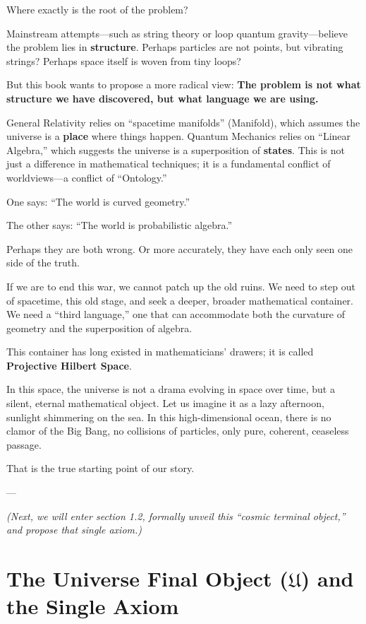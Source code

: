 \documentclass[11pt,a4paper,twoside]{book}
\begin{document}
Where exactly is the root of the problem?

Mainstream attempts---such as string theory or loop quantum gravity---believe the problem lies in \textbf{structure}. Perhaps particles are not points, but vibrating strings? Perhaps space itself is woven from tiny loops?

But this book wants to propose a more radical view: \textbf{The problem is not what structure we have discovered, but what language we are using.}

General Relativity relies on ``spacetime manifolds'' (Manifold), which assumes the universe is a \textbf{place} where things happen. Quantum Mechanics relies on ``Linear Algebra,'' which suggests the universe is a superposition of \textbf{states}. This is not just a difference in mathematical techniques; it is a fundamental conflict of worldviews---a conflict of ``Ontology.''

One says: ``The world is curved geometry.''

The other says: ``The world is probabilistic algebra.''

Perhaps they are both wrong. Or more accurately, they have each only seen one side of the truth.

If we are to end this war, we cannot patch up the old ruins. We need to step out of spacetime, this old stage, and seek a deeper, broader mathematical container. We need a ``third language,'' one that can accommodate both the curvature of geometry and the superposition of algebra.

This container has long existed in mathematicians' drawers; it is called \textbf{Projective Hilbert Space}.

In this space, the universe is not a drama evolving in space over time, but a silent, eternal mathematical object. Let us imagine it as a lazy afternoon, sunlight shimmering on the sea. In this high-dimensional ocean, there is no clamor of the Big Bang, no collisions of particles, only pure, coherent, ceaseless passage.

That is the true starting point of our story.

---

\textit{(Next, we will enter section 1.2, formally unveil this ``cosmic terminal object,'' and propose that single axiom.)}

 \section{The Universe Final Object ($\mathfrak U$) and the Single Axiom}
\end{document}
